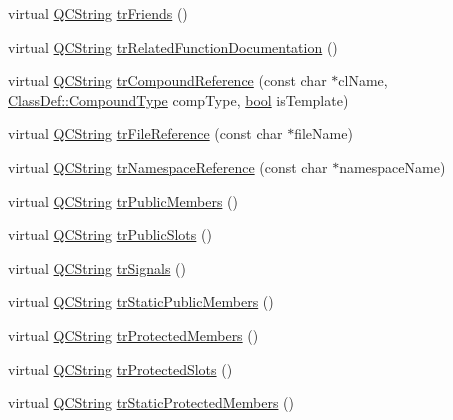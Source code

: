 \begin{DoxyCompactItemize}
\item 
virtual \hyperlink{class_q_c_string}{Q\+C\+String} \hyperlink{class_translator_norwegian_a96f8017637d4f6ea626b0cfcbedff4f1}{tr\+Friends} ()
\item 
virtual \hyperlink{class_q_c_string}{Q\+C\+String} \hyperlink{class_translator_norwegian_a1d396db3adaa87cd7162d3997f4b0244}{tr\+Related\+Function\+Documentation} ()
\item 
virtual \hyperlink{class_q_c_string}{Q\+C\+String} \hyperlink{class_translator_norwegian_ac12c2d71889035d00a6f77d306139b5c}{tr\+Compound\+Reference} (const char $\ast$cl\+Name, \hyperlink{class_class_def_ae70cf86d35fe954a94c566fbcfc87939}{Class\+Def\+::\+Compound\+Type} comp\+Type, \hyperlink{qglobal_8h_a1062901a7428fdd9c7f180f5e01ea056}{bool} is\+Template)
\item 
virtual \hyperlink{class_q_c_string}{Q\+C\+String} \hyperlink{class_translator_norwegian_a495c2b1a87aa3714b8e5d9a67a836aed}{tr\+File\+Reference} (const char $\ast$file\+Name)
\item 
virtual \hyperlink{class_q_c_string}{Q\+C\+String} \hyperlink{class_translator_norwegian_a0537fbc1fa13ccd1fa75f890f067f2ca}{tr\+Namespace\+Reference} (const char $\ast$namespace\+Name)
\item 
virtual \hyperlink{class_q_c_string}{Q\+C\+String} \hyperlink{class_translator_norwegian_a510a13441d880ac22de6d3b2dc115de4}{tr\+Public\+Members} ()
\item 
virtual \hyperlink{class_q_c_string}{Q\+C\+String} \hyperlink{class_translator_norwegian_ae5a7d43e7de39e96ea49e99621c80889}{tr\+Public\+Slots} ()
\item 
virtual \hyperlink{class_q_c_string}{Q\+C\+String} \hyperlink{class_translator_norwegian_acab1a0e50b63fd901eba63f71536205c}{tr\+Signals} ()
\item 
virtual \hyperlink{class_q_c_string}{Q\+C\+String} \hyperlink{class_translator_norwegian_afd59f0d6acd23335906d3083816e96ff}{tr\+Static\+Public\+Members} ()
\item 
virtual \hyperlink{class_q_c_string}{Q\+C\+String} \hyperlink{class_translator_norwegian_aaf9918df4485eba1301812f7c93c724f}{tr\+Protected\+Members} ()
\item 
virtual \hyperlink{class_q_c_string}{Q\+C\+String} \hyperlink{class_translator_norwegian_a62f1d3e5b2cea7b6d686e89636fdcf53}{tr\+Protected\+Slots} ()
\item 
virtual \hyperlink{class_q_c_string}{Q\+C\+String} \hyperlink{class_translator_norwegian_a7a1e26c209daa24a8994b91ab2d44065}{tr\+Static\+Protected\+Members} ()

\end{DoxyCompactItemize}
